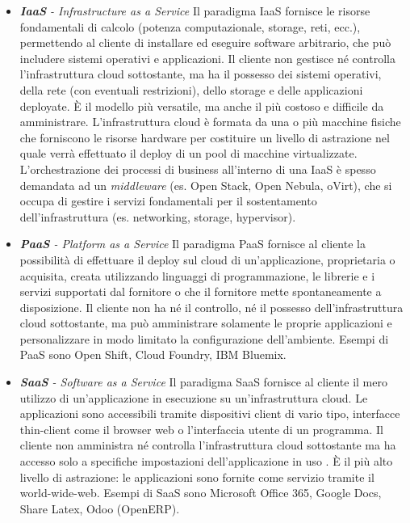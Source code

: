 \documentclass[../main.tex]{subfiles}
\begin{document}
\begin{itemize}
\item \textit{\textbf{IaaS} - Infrastructure as a Service} Il paradigma IaaS fornisce le risorse fondamentali di calcolo (potenza computazionale, storage, reti, ecc.), permettendo al cliente di installare ed eseguire software arbitrario, che può includere sistemi operativi e applicazioni. Il cliente non gestisce né controlla l'infrastruttura cloud sottostante, ma ha il possesso dei sistemi operativi, della rete (con eventuali restrizioni), dello storage e delle applicazioni deployate.
\`E il modello più versatile, ma anche il più costoso e difficile da amministrare.
L'infrastruttura cloud è formata da una o più macchine fisiche che forniscono le risorse hardware per costituire un livello di astrazione nel quale verrà effettuato il deploy di un pool di macchine virtualizzate.
L'orchestrazione dei processi di business all'interno di una IaaS è spesso demandata ad un \textit{middleware} (es. Open Stack, Open Nebula, oVirt), che si occupa di gestire i servizi fondamentali per il sostentamento dell'infrastruttura (es. networking, storage, hypervisor).
\item \textit{\textbf{PaaS} - Platform as a Service} Il paradigma PaaS fornisce al cliente la possibilità di effettuare il deploy sul cloud di un'applicazione, proprietaria o acquisita, creata utilizzando linguaggi di programmazione, le librerie e i servizi supportati dal fornitore o che il fornitore mette spontaneamente a disposizione. Il cliente non ha né il controllo, né il possesso dell'infrastruttura cloud sottostante, ma può amministrare solamente le proprie applicazioni e personalizzare in modo limitato la configurazione dell'ambiente.
Esempi di PaaS sono Open Shift, Cloud Foundry, IBM Bluemix.
\item \textit{\textbf{SaaS} - Software as a Service} Il paradigma SaaS fornisce al cliente il mero utilizzo di un'applicazione in esecuzione su un'infrastruttura cloud. Le applicazioni sono accessibili tramite dispositivi client di vario tipo, interfacce thin-client come il browser web o l'interfaccia utente di un programma.
Il cliente non amministra né controlla l'infrastruttura cloud sottostante ma ha accesso solo a specifiche impostazioni dell'applicazione in uso \cite{NISTCloud}.
\`E il più alto livello di astrazione: le applicazioni sono fornite come servizio tramite il world-wide-web. 
Esempi di SaaS sono Microsoft Office 365, Google Docs, Share Latex, Odoo (OpenERP).
\end{itemize}
\end{document}
